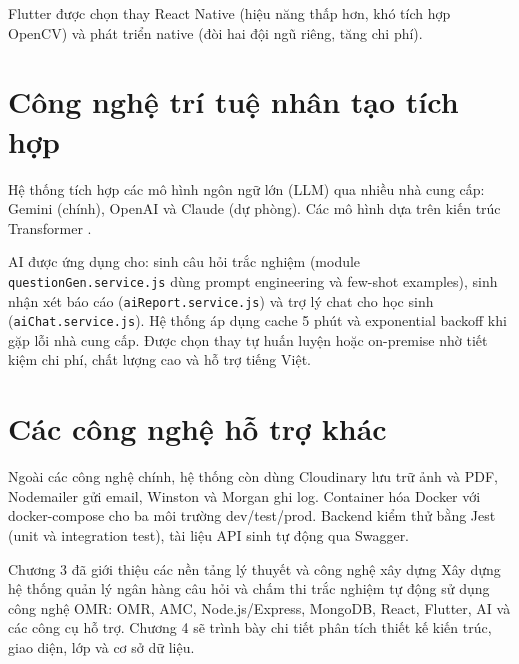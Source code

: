 ﻿\documentclass[../DoAn.tex]{subfiles}
\begin{document}
Flutter được chọn thay React Native (hiệu năng thấp hơn, khó tích hợp OpenCV) và phát triển native (đòi hai đội ngũ riêng, tăng chi phí).

\section{Công nghệ trí tuệ nhân tạo tích hợp}
\label{section:3.6}

Hệ thống tích hợp các mô hình ngôn ngữ lớn (LLM) qua nhiều nhà cung cấp: Gemini \cite{gemini} (chính), OpenAI \cite{openaiapi} và Claude (dự phòng). Các mô hình dựa trên kiến trúc Transformer \cite{vaswani2017attention}.

AI được ứng dụng cho: sinh câu hỏi trắc nghiệm (module \texttt{questionGen.service.js} dùng prompt engineering và few-shot examples), sinh nhận xét báo cáo (\texttt{aiReport.service.js}) và trợ lý chat cho học sinh (\texttt{aiChat.service.js}). Hệ thống áp dụng cache 5 phút và exponential backoff khi gặp lỗi nhà cung cấp. Được chọn thay tự huấn luyện hoặc on-premise nhờ tiết kiệm chi phí, chất lượng cao và hỗ trợ tiếng Việt.

\section{Các công nghệ hỗ trợ khác}
\label{section:3.7}

Ngoài các công nghệ chính, hệ thống còn dùng Cloudinary \cite{cloudinary} lưu trữ ảnh và PDF, Nodemailer gửi email, Winston và Morgan ghi log. Container hóa Docker với docker-compose cho ba môi trường dev/test/prod. Backend kiểm thử bằng Jest (unit và integration test), tài liệu API sinh tự động qua Swagger.

Chương 3 đã giới thiệu các nền tảng lý thuyết và công nghệ xây dựng Xây dựng hệ thống quản lý ngân hàng câu hỏi và chấm thi trắc nghiệm tự động sử dụng công nghệ OMR: OMR, AMC, Node.js/Express, MongoDB, React, Flutter, AI và các công cụ hỗ trợ. Chương 4 sẽ trình bày chi tiết phân tích thiết kế kiến trúc, giao diện, lớp và cơ sở dữ liệu.
\end{document}
